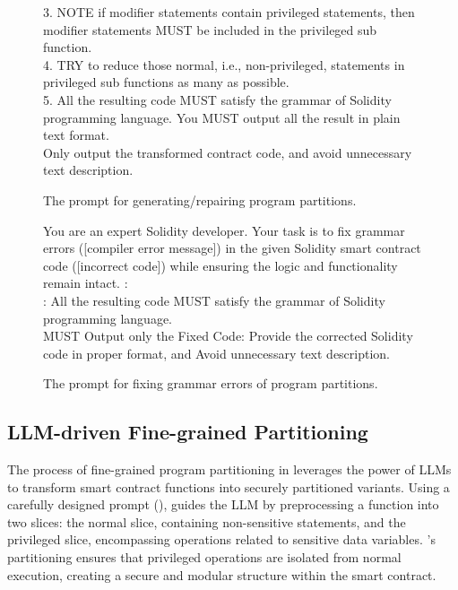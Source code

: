 \begin{figure*}[t]
\begin{tcolorbox}[title=Generation/Repairing Prompt for Program Partitions]
3. NOTE if modifier statements contain privileged statements, then modifier statements MUST be included in the privileged sub function.\\
4. TRY to reduce those normal, i.e., non-privileged, statements in privileged sub functions as many as possible.\\
5. All the resulting code MUST satisfy the grammar of Solidity programming language.
\tcbline
You MUST output all the result in plain text format.\\
Only output the transformed contract code, and avoid unnecessary text description.

\end{tcolorbox}
    
\caption{The prompt for generating/repairing program partitions.}
\label{fig:partitionprompt}
\end{figure*}

\begin{figure*}[t]
\begin{tcolorbox}[title=Grammar-Fix Prompt for Program Partitions]
You are an expert Solidity developer. Your task is to fix grammar errors ([compiler error message]) in the given Solidity smart contract code ([incorrect code]) while ensuring the logic and functionality remain intact. 
\tcbline
{}:       \\
:      
\tcbline
All the resulting code MUST satisfy the grammar of Solidity programming language.\\
MUST Output only the Fixed Code: Provide the corrected Solidity code in proper format, and Avoid unnecessary text description.
\end{tcolorbox}
    
\caption{The prompt for fixing grammar errors of program partitions.}
\label{fig:fixprompt}
\end{figure*}
\subsection{LLM-driven Fine-grained Partitioning}
The process of fine-grained program partitioning in \tool leverages the power of LLMs to transform smart contract functions into securely partitioned variants. Using a carefully designed prompt (), \tool guides the LLM by preprocessing a function into two slices: the normal slice, containing non-sensitive statements, and the privileged slice, encompassing operations related to sensitive data variables. 
\tool's partitioning ensures that privileged operations are isolated from normal execution, creating a secure and modular structure within the smart contract.


